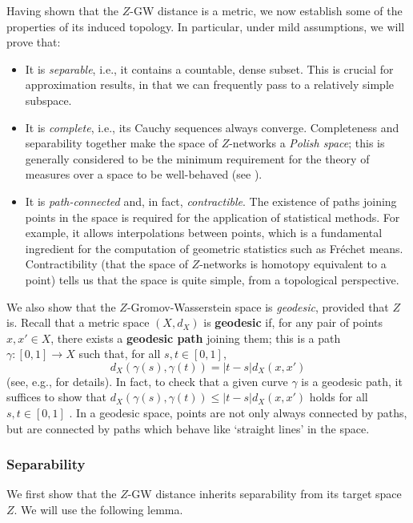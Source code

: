 \documentclass[twoside,11pt]{article}
\theoremstyle{definition}
\newcommand{\define}[1]{\textbf{#1}}
\begin{document}
Having shown that the $Z$-GW distance is a metric, we now establish some of the properties of its induced topology. In particular, under mild assumptions, we will prove that:
\begin{itemize}
    \item It is \emph{separable}, i.e., it contains a countable, dense subset. This is crucial for approximation results, in that we can frequently pass to a relatively simple subspace.
    \item It is \emph{complete}, i.e., its Cauchy sequences always converge. Completeness and separability together make the space of $Z$-networks a \emph{Polish space}; this is generally considered to be the minimum requirement for the theory of measures over a space to be well-behaved (see ).
    \item It is \emph{path-connected} and, in fact, \emph{contractible}. The existence of paths joining points in the space is required for the application of statistical methods. For example, it allows interpolations between points, which is a fundamental ingredient for the computation of geometric statistics such as Fr\'{e}chet means. Contractibility (that the space of $Z$-networks is homotopy equivalent to a point) tells us that the space is quite simple, from a topological perspective.
\end{itemize}
We also show that the $Z$-Gromov-Wasserstein space is \emph{geodesic}, provided that $Z$ is. Recall that a metric space $(X,d_X)$ is \define{geodesic} if, for any pair of points $x,x' \in X$, there exists a \define{geodesic path} joining them; this is a path $\gamma:[0,1] \to X$ such that, for all $s,t \in [0,1]$,
\[
d_X(\gamma(s),\gamma(t)) = |t-s| d_X(x,x')
\]
(see, e.g., \citet{burago2022course} for details). In fact, to check that a given curve $\gamma$ is a geodesic path, it suffices to show that $d_X(\gamma(s),\gamma(t)) \leq |t-s| d_X(x,x')$ holds for all $s,t \in [0,1]$ \citep[Lemma 1.3]{chowdhury2018explicit}. In a geodesic space, points are not only always connected by paths, but are connected by paths which behave like `straight lines' in the space.


\subsubsection{Separability}
We first show that the $Z$-GW distance inherits separability from its target space $Z$. We will use the following lemma. 
\end{document}
